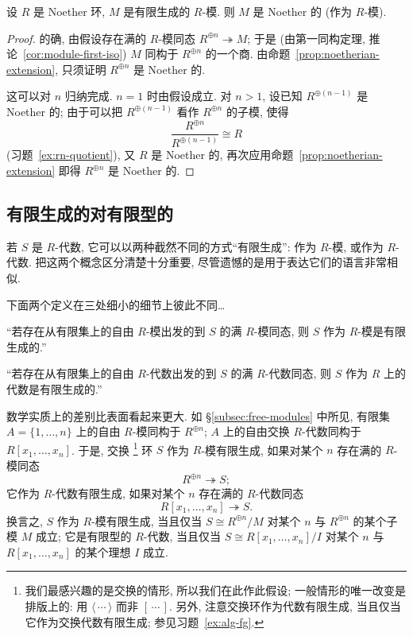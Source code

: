 \begin{corollary}
\label{cor:noetherian-fg}
设 $R$ 是 Noether 环, $M$ 是有限生成的 $R$-模. 则 $M$ 是 Noether 的 (作为 $R$-模).
\end{corollary}

\begin{proof}
的确, 由假设存在满的 $R$-模同态 $R^{\oplus n} \twoheadrightarrow M$; 于是 (由第一同构定理, 推论~\ref{cor:module-first-iso}) $M$ 同构于 $R^{\oplus n}$ 的一个商. 由命题~\ref{prop:noetherian-extension}, 只须证明 $R^{\oplus n}$ 是 Noether 的.

这可以对 $n$ 归纳完成. $n = 1$ 时由假设成立. 对 $n > 1$, 设已知 $R^{\oplus(n-1)}$ 是 Noether 的; 由于可以把 $R^{\oplus(n-1)}$ 看作 $R^{\oplus n}$ 的子模, 使得
\[
\frac{R^{\oplus n}}{R^{\oplus(n-1)}} \cong R
\]
(习题~\ref{ex:rn-quotient}), 又 $R$ 是 Noether 的, 再次应用命题~\ref{prop:noetherian-extension} 即得 $R^{\oplus n}$ 是 Noether 的.
\end{proof}

\subsection{有限生成的对有限型的}
\label{subsec:finite-type}

若 $S$ 是 $R$-代数, 它可以以两种截然不同的方式``有限生成'': 作为 $R$-模, 或作为 $R$-代数. 把这两个概念区分清楚十分重要, 尽管遗憾的是用于表达它们的语言非常相似.

下面两个定义在三处细小的细节上彼此不同\ldots

``若存在从有限集上的自由 $R$-模出发的到 $S$ 的满 $R$-模同态, 则 $S$ 作为 $R$-模是有限生成的.''

``若存在从有限集上的自由 $R$-代数出发的到 $S$ 的满 $R$-代数同态, 则 $S$ 作为 $R$ 上的代数是有限生成的.''

数学实质上的差别比表面看起来更大. 如 \S\ref{subsec:free-modules} 中所见, 有限集 $A = \{1, \ldots, n\}$ 上的自由 $R$-模同构于 $R^{\oplus n}$; $A$ 上的自由交换 $R$-代数同构于 $R[x_1, \ldots, x_n]$. 于是, 交换%
\footnote{我们最感兴趣的是交换的情形, 所以我们在此作此假设; 一般情形的唯一改变是排版上的: 用 $\langle\,\cdots\,\rangle$ 而非 $[\,\cdots\,]$. 另外, 注意交换环作为代数有限生成, 当且仅当它作为交换代数有限生成; 参见习题~\ref{ex:alg-fg}.}%
环 $S$ 作为 $R$-模有限生成, 如果对某个 $n$ 存在满的 $R$-模同态
\[
R^{\oplus n} \twoheadrightarrow S;
\]
它作为 $R$-代数有限生成, 如果对某个 $n$ 存在满的 $R$-代数同态
\[
R[x_1, \dots, x_n] \twoheadrightarrow S.
\]
换言之, $S$ 作为 $R$-模有限生成, 当且仅当 $S \cong R^{\oplus n}/M$ 对某个 $n$ 与 $R^{\oplus n}$ 的某个子模 $M$ 成立; 它是有限型的 $R$-代数, 当且仅当 $S \cong R[x_1, \ldots, x_n]/I$ 对某个 $n$ 与 $R[x_1, \ldots, x_n]$ 的某个理想 $I$ 成立.

